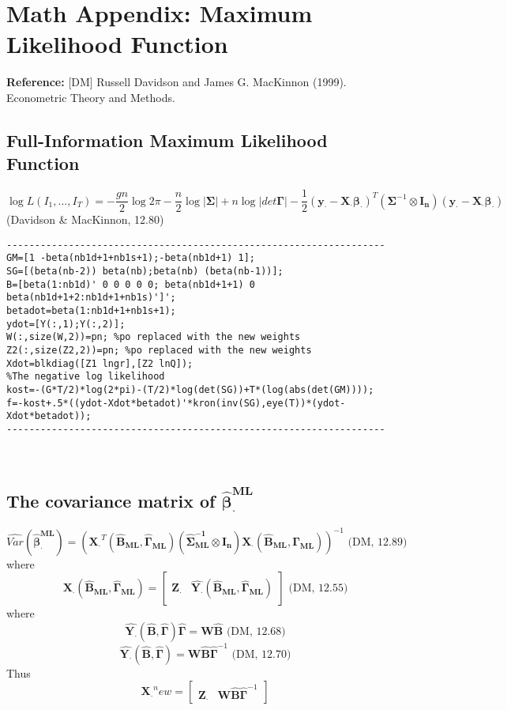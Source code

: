 \documentclass[12pt]{article}
\begin{document}
\section{Math Appendix: Maximum Likelihood Function}

\textbf{Reference:} [DM] Russell Davidson and James G. MacKinnon (1999). Econometric Theory and Methods.

\subsection{Full-Information Maximum Likelihood Function }
\[\log L (I_1,...,I_T) = -\frac{gn}{2}\log 2\pi -\frac{n}{2}\log \left | \bm{\Sigma} \right |  +n\log \left | det \bm{\Gamma} \right | - \frac{1}{2}(\bm{y_\cdot}-\bm{X_\cdot \beta_\cdot})^T(\bm{\Sigma}^{-1}\otimes \bm{I_n})(\bm{y_\cdot}-\bm{X_\cdot \beta_\cdot})\]
(Davidson \& MacKinnon, 12.80)
\lstset{language=Matlab} 
\begin{lstlisting}
-------------------------------------------------------------------
GM=[1 -beta(nb1d+1+nb1s+1);-beta(nb1d+1) 1];
SG=[(beta(nb-2)) beta(nb);beta(nb) (beta(nb-1))]; 
B=[beta(1:nb1d)' 0 0 0 0 0; beta(nb1d+1+1) 0 beta(nb1d+1+2:nb1d+1+nb1s)']';
betadot=beta(1:nb1d+1+nb1s+1);
ydot=[Y(:,1);Y(:,2)];
W(:,size(W,2))=pn; %po replaced with the new weights
Z2(:,size(Z2,2))=pn; %po replaced with the new weights
Xdot=blkdiag([Z1 lngr],[Z2 lnQ]);
%The negative log likelihood
kost=-(G*T/2)*log(2*pi)-(T/2)*log(det(SG))+T*(log(abs(det(GM)))); 
f=-kost+.5*((ydot-Xdot*betadot)'*kron(inv(SG),eye(T))*(ydot-Xdot*betadot)); 
-------------------------------------------------------------------
\end{lstlisting}
\ \ \

\subsection{The covariance matrix of $\bm{\hat{\beta}_\cdot^{ML}}$ }
\[\hat{Var}(\bm{\hat{\beta}_\cdot^{ML}})=(\bm{X_\cdot}^T(\bm{\hat{B}_{ML}},\bm{\hat{\Gamma}_{ML}}) ( \bm{\hat{\Sigma}_{ML}^{-1} \otimes \bm{I_n}  })\bm{X_\cdot} (\bm{\hat{B}_{ML}},\bm{\hat{\Gamma}_{ML}}))^{-1} \text{      (DM, 12.89) }\]
where
\[\bm{X_\cdot} (\bm{\hat{B}_{ML}},\bm{\hat{\Gamma}_{ML}}) = 
\begin{bmatrix}
\bm{Z_\cdot} & \hat{\bm{Y_\cdot}}(\bm{\hat{B}_{ML}},\bm{\hat{\Gamma}_{ML}})
\end{bmatrix} \text{     (DM, 12.55)}\]
where
\[\hat{\bm{Y_\cdot}}(\bm{\hat{B}},\bm{\hat{\Gamma}}) \bm{\hat{\Gamma}} = \bm{W\hat{B}} \text{      (DM, 12.68)}\]
\[\hat{\bm{Y_\cdot}}(\bm{\hat{B}},\bm{\hat{\Gamma}}) = \bm{W\hat{B}} \bm{\hat{\Gamma}} ^{-1} \text{      (DM, 12.70)}\]
Thus
\[\bm{X_\cdot}^new = 
\begin{bmatrix}
\bm{Z_\cdot} & \bm{W\hat{B}} \bm{\hat{\Gamma}} ^{-1}
\end{bmatrix}\]
\end{document}
